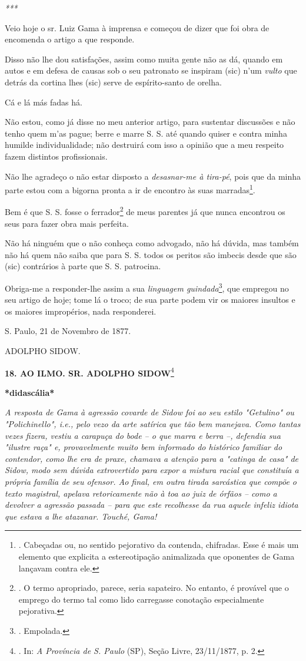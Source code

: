 \emph{***}

Veio hoje o sr. Luiz Gama à imprensa e começou de dizer que foi obra de
encomenda o artigo a que responde.

Disso não lhe dou satisfações, assim como muita gente não as dá, quando
em autos e em defesa de causas sob o seu patronato se inspiram (sic)
n'um \emph{vulto} que detrás da cortina lhes (sic) serve de
espírito-santo de orelha.

Cá e lá más fadas há.

Não estou, como já disse no meu anterior artigo, para sustentar
discussões e não tenho quem m'as pague; berre e marre S. S. até quando
quiser e contra minha humilde individualidade; não destruirá com isso a
opinião que a meu respeito fazem distintos profissionais.

Não lhe agradeço o não estar disposto a \emph{desasnar-me à tira-pé},
pois que da minha parte estou com a bigorna pronta a ir de encontro às
suas marradas\footnote{. Cabeçadas ou, no sentido pejorativo da
  contenda, chifradas. Esse é mais um elemento que explicita a
  estereotipação animalizada que oponentes de Gama lançavam contra ele.}.

Bem é que S. S. fosse o ferrador\footnote{. O termo apropriado, parece,
  seria sapateiro. No entanto, é provável que o emprego do termo tal
  como lido carregasse conotação especialmente pejorativa.} de meus
parentes já que nunca encontrou os seus para fazer obra mais perfeita.

Não há ninguém que o não conheça como advogado, não há dúvida, mas
também não há quem não saiba que para S. S. todos os peritos são imbecis
desde que são (sic) contrários à parte que S. S. patrocina.

Obriga-me a responder-lhe assim a sua \emph{linguagem
guindada}\footnote{. Empolada.},
qu\protect\hypertarget{Secao_Sem_Titulo-25}{}{}e empregou no seu artigo
de hoje; tome lá o troco; de sua parte podem vir os maiores insultos e
os maiores impropérios, nada responderei.

S. Paulo, 21 de Novembro de 1877.

ADOLPHO SIDOW.

\textbf{18. AO ILMO. SR. ADOLPHO SIDOW}\footnote{. In: \emph{A Província
  de S. Paulo} (SP), Seção Livre, 23/11/1877, p. 2.}

\textbf{*didascália*}

\emph{A resposta de Gama à agressão covarde de Sidow foi ao seu estilo
"Getulino" ou "Polichinello", i.e., pelo vezo da arte satírica que tão
bem manejava. Como tantas vezes fizera, vestiu a carapuça do bode -- o
que marra e berra --, defendia sua "ilustre raça" e, provavelmente muito
bem informado do histórico familiar do contendor, como lhe era de praxe,
chamava a atenção para a "catinga de casa" de Sidow, modo sem dúvida
extrovertido para expor a mistura racial que constituía a própria
família de seu ofensor. Ao final, em outra tirada sarcástica que compõe
o texto magistral, apelava retoricamente não à toa ao juiz de órfãos --
como a devolver a agressão passada -- para que este recolhesse da rua
aquele infeliz idiota que estava a lhe atazanar. Touché, Gama! }

